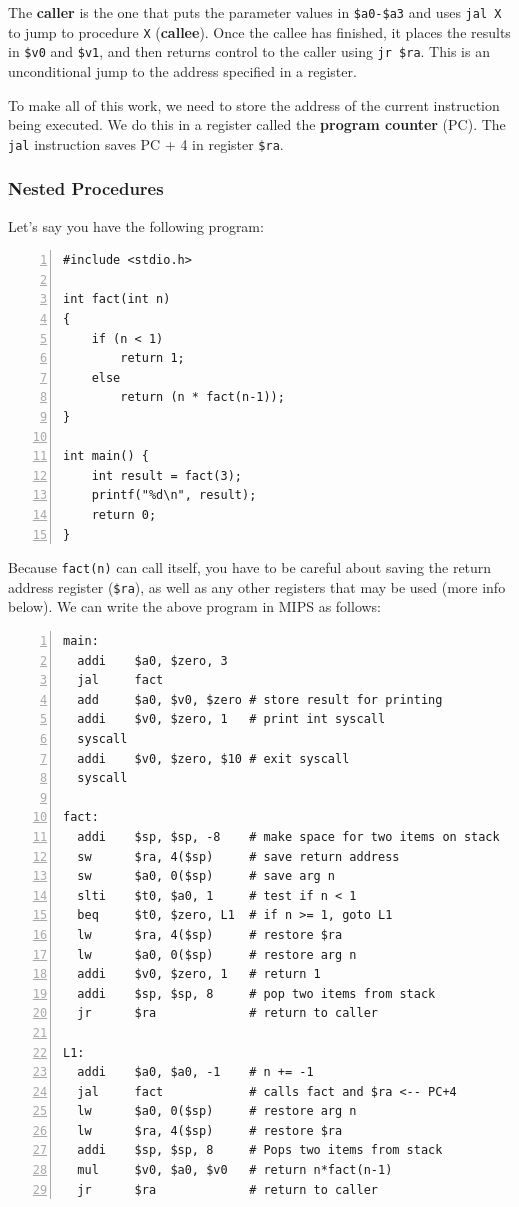\documentclass[10pt]{article}
\begin{document}
The \textbf{caller} is the one that puts the parameter values in \texttt{\$a0-\$a3} and uses \texttt{jal X} to jump to procedure \texttt{X} (\textbf{callee}).  Once the callee has finished, it places the results in \texttt{\$v0} and \texttt{\$v1}, and then returns control to the caller using \texttt{jr \$ra}.  This is an unconditional jump to the address specified in a register.

To make all of this work, we need to store the address of the current instruction being executed.  We do this in a register called the \textbf{program counter} (PC). The \texttt{jal} instruction saves PC + 4 in register \texttt{\$ra}.

\subsubsection{Nested Procedures}
Let's say you have the following program:
\begin{lstlisting}[style=CStyle, numbers=left, xleftmargin=5.0ex, aboveskip=2em, belowskip=2em, numberstyle=\color{blue}, escapeinside=||]
#include <stdio.h>

int fact(int n)
{
    if (n < 1)
        return 1;
    else
        return (n * fact(n-1));
}

int main() {
    int result = fact(3);
    printf("%d\n", result);
    return 0;
}
\end{lstlisting}
Because \texttt{fact(n)} can call itself, you have to be careful about saving the return address register (\texttt{\$ra}), as well as any other registers that may be used (more info below).  We can write the above program in MIPS as follows:
\begin{lstlisting}[style=CStyle, numbers=left, xleftmargin=5.0ex, aboveskip=2em, belowskip=2em, numberstyle=\color{blue}, escapeinside=||]
main:
  addi    $a0, $zero, 3
  jal     fact
  add     $a0, $v0, $zero # store result for printing
  addi    $v0, $zero, 1   # print int syscall
  syscall
  addi    $v0, $zero, $10 # exit syscall
  syscall
  
fact:
  addi    $sp, $sp, -8    # make space for two items on stack
  sw      $ra, 4($sp)     # save return address
  sw      $a0, 0($sp)     # save arg n
  slti    $t0, $a0, 1     # test if n < 1
  beq     $t0, $zero, L1  # if n >= 1, goto L1
  lw      $ra, 4($sp)     # restore $ra
  lw      $a0, 0($sp)     # restore arg n
  addi    $v0, $zero, 1   # return 1
  addi    $sp, $sp, 8     # pop two items from stack
  jr      $ra             # return to caller

L1:
  addi    $a0, $a0, -1    # n += -1
  jal     fact            # calls fact and $ra <-- PC+4
  lw      $a0, 0($sp)     # restore arg n
  lw      $ra, 4($sp)     # restore $ra
  addi    $sp, $sp, 8     # Pops two items from stack
  mul     $v0, $a0, $v0   # return n*fact(n-1)
  jr      $ra             # return to caller
\end{lstlisting}
\end{document}
